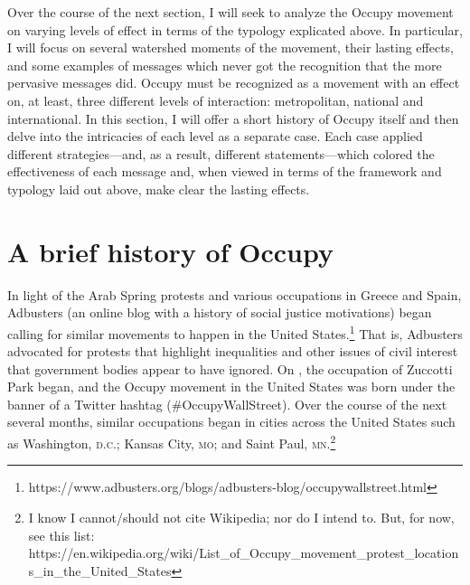 \documentclass{article}
\begin{document}



Over the course of the next section, I will seek to analyze the Occupy movement on varying levels of effect in terms of the typology explicated above.
In particular, I will focus on several watershed moments of the movement, their lasting effects, and some examples of messages which never got the recognition that the more pervasive messages did.
Occupy must be recognized as a movement with an effect on, at least, three different levels of interaction: metropolitan, national and international.
In this section, I will offer a short history of Occupy itself and then delve into the intricacies of each level as a separate case.
Each case applied different strategies---and, as a result, different statements---which colored the effectiveness of each message and, when viewed in terms of the framework and typology laid out above, make clear the lasting effects.


\section{A brief history of Occupy}
In light of the Arab Spring protests and various occupations in Greece and Spain, Adbusters (an online blog with a history of social justice motivations) began calling for similar movements to happen in the United States.\footnote{https://www.adbusters.org/blogs/adbusters-blog/occupywallstreet.html}
That is, Adbusters advocated for protests that highlight inequalities and other issues of civil interest that government bodies appear to have ignored.
On , the occupation of Zuccotti Park began, and the Occupy movement in the United States was born under the banner of a Twitter hashtag (\#OccupyWallStreet).
Over the course of the next several months, similar occupations began in cities across the United States such as Washington, \textsc{d.c.}; Kansas City, \textsc{mo}; and Saint Paul, \textsc{mn}.\footnote{I know I cannot/should not cite Wikipedia; nor do I intend to. But, for now, see this list: https://en.wikipedia.org/wiki/List\_of\_Occupy\_movement\_protest\_locations\_in\_the\_United\_States}
\end{document}
